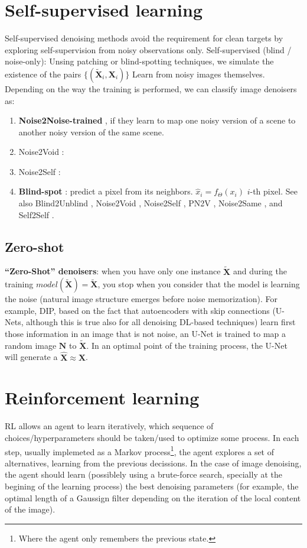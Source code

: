 \section{Self-supervised learning}
Self-supervised denoising methods avoid the requirement for clean
targets by exploring self-supervision from noisy observations only.
Self-supervised (blind / noise-only): Unsing patching or
blind-spotting techniques, we simulate the existence of the pairs
$\{(\tilde{\bm{X}}_i,\bm{X}_i)\}$ Learn from noisy images themselves.
Depending on the way the training is performed, we can classify image
denoisers as:
\begin{enumerate}
\item \textbf{Noise2Noise-trained}
  \cite{lehtinen2018noise2noise_conference}, if they learn to map one
  noisy version of a scene to another noisy version of the same scene.
\item Noise2Void \cite{krull2019noise2void}:
\item Noise2Self \cite{batson2019noise2self}:
\item \textbf{Blind-spot} \cite{wang2022blind2unblind}: predict a
  pixel from its neighbors. $\hat{x}_i=f_\Theta(x_{i})$ $i$-th
  pixel. See also Blind2Unblind \cite{kim2025self}, Noise2Void
  \cite{krull2019noise2void}, Noise2Self \cite{batson2019noise2self},
  PN2V \cite{krull2020probabilistic}, Noise2Same
  \cite{xie2020noise2same}, and Self2Self \cite{quan2020self2self}.
\end{enumerate}

\subsection{Zero-shot}
\textbf{``Zero-Shot'' denoisers}: when you have only one instance
$\tilde{\bm{X}}$ and during the training
$model(\tilde{\bm{X}})=\tilde{\bm{X}}$, you stop when you consider
that the model is learning the noise (natural image structure emerges
before noise memorization). For example, \gls{DIP}, based on the fact
that autoencoders with skip connections (U-Nets, although this is true
also for all denoising \gls{DL}-based techniques) learn first those
information in an image that is not noise, an U-Net is trained to map
a random image $\bm{N}$ to $\tilde{\bm{X}}$. In an optimal point of
the training process, the U-Net will generate a
$\hat{\bm{X}}\approx\bm{X}$.

\section{Reinforcement learning}
\gls{RL} allows an agent to learn iteratively, which sequence of
choices/hyperparameters should be taken/used to optimize some
process. In each step, usually implemeted as a Markov
process\footnote{Where the agent only remembers the previous state.},
the agent explores a set of alternatives, learning from the previous
decissions. In the case of image denoising, the agent should learn
(possiblely using a brute-force search, specially at the begining of
the learning process) the best denoising parameters (for example, the
optimal length of a Gaussign filter depending on the iteration of the
local content of the image).

